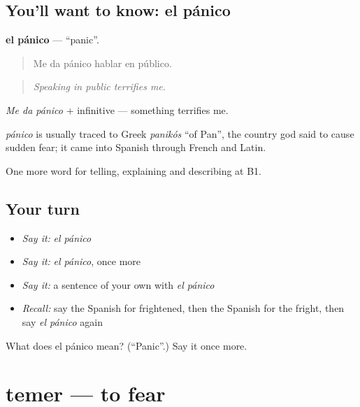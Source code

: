 \subsection*{You'll want to know: el pánico}
\textbf{el pánico} — \textquotedblleft{}panic\textquotedblright{}.

\begin{quote}
Me da pánico hablar en público.
\end{quote}

\begin{quote}
\emph{Speaking in public terrifies me.}
\end{quote}

\emph{Me da pánico} + infinitive — something terrifies me.

\begin{cousinweb}
\emph{pánico} is usually traced to Greek \emph{panikós} \textquotedblleft{}of Pan\textquotedblright{}, the country god said to cause sudden fear; it came into Spanish through French and Latin.
\end{cousinweb}

\begin{grammarlens}[title={What you've built}]
One more word for telling, explaining and describing at B1.
\end{grammarlens}

\subsection*{Your turn}
\begin{itemize}
\raggedright
  \item \emph{Say it:} \emph{el pánico}
  \item \emph{Say it:} \emph{el pánico}, once more
  \item \emph{Say it:} a sentence of your own with \emph{el pánico}
  \item \emph{Recall:} say the Spanish for frightened, then the Spanish for the fright, then say \emph{el pánico} again
\end{itemize}

\begin{tcolorbox}[breakable,colback=teal!4,colframe=teal!35!black,title={Before you move on}]
What does el pánico mean? (\textquotedblleft{}Panic\textquotedblright{}.) Say it once more.
\end{tcolorbox}
\section[temer]{temer — to fear}

